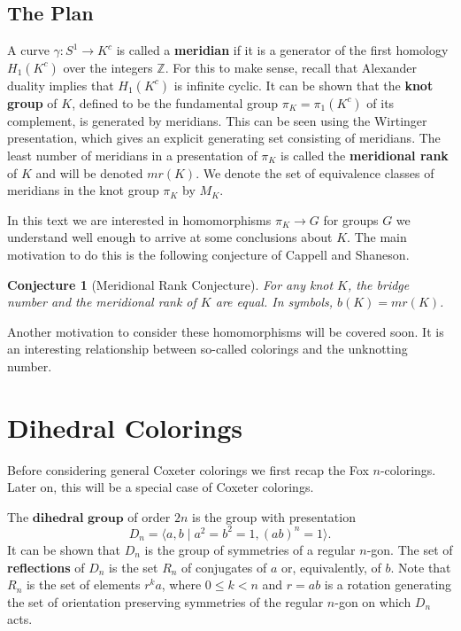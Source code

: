 \documentclass{article}
\newtheorem{conjecture}[theorem]{Conjecture}
\theoremstyle{definition}
\begin{document}
\subsection{The Plan}
A curve $\gamma: S^1 \rightarrow K^c$ is called a \textbf{meridian} if it is a generator of the first homology $H_1(K^c)$ over the integers $\mathbb{Z}$. For this to make sense, recall that Alexander duality implies that $H_1(K^c)$ is infinite cyclic. It can be shown that the \textbf{knot group} of $K$, defined to be the fundamental group $\pi_K = \pi_1(K^c)$ of its complement, is generated by meridians. This can be seen using the Wirtinger presentation, which gives an explicit generating set consisting of meridians. The least number of meridians in a presentation of $\pi_K$ is called the \textbf{meridional rank} of $K$ and will be denoted $mr(K)$. We denote the set of equivalence classes of meridians in the knot group $\pi_K$ by $M_K$.

In this text we are interested in homomorphisms $\pi_K \rightarrow G$ for groups $G$ we understand well enough to arrive at some conclusions about $K$. The main motivation to do this is the following conjecture of Cappell and Shaneson.

\begin{conjecture}[Meridional Rank Conjecture]
For any knot $K$, the bridge number and the meridional rank of $K$ are equal. In symbols, $b(K) = mr(K)$.
\end{conjecture}

Another motivation to consider these homomorphisms will be covered soon. It is an interesting relationship between so-called colorings and the unknotting number.

\section{Dihedral Colorings}
Before considering general Coxeter colorings we first recap the Fox $n$-colorings. Later on, this will be a special case of Coxeter colorings. 

The $\textbf{dihedral group}$ of order $2n$ is the group with presentation $$D_n = \langle a, b \; | \; a^2 = b^2 = 1, (ab)^n = 1 \rangle.$$
It can be shown that $D_n$ is the group of symmetries of a regular $n$-gon. The set of \textbf{reflections} of $D_n$ is the set $R_n$ of conjugates of $a$ or, equivalently, of $b$. Note that $R_n$ is the set of elements $r^ka$, where $0 \leq k < n$ and $r = ab$ is a rotation generating the set of orientation preserving symmetries of the regular $n$-gon on which $D_n$ acts.
\end{document}
